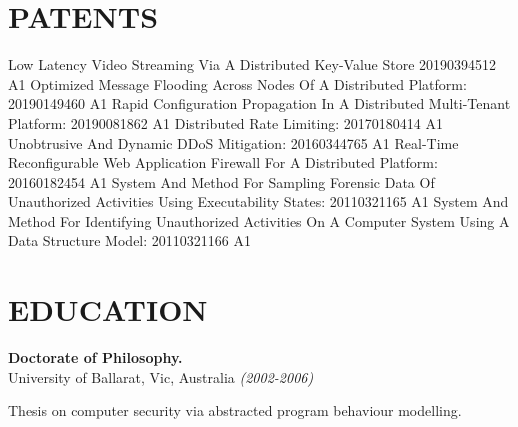 \documentclass[margin]{res}
\begin{document}
\begin{resume}



\section{PATENTS}
 Low Latency Video Streaming Via A Distributed Key-Value Store 20190394512 A1
 Optimized Message Flooding Across Nodes Of A Distributed Platform: 20190149460 A1
 Rapid Configuration Propagation In A Distributed Multi-Tenant Platform: 20190081862 A1
 Distributed Rate Limiting: 20170180414 A1
 Unobtrusive And Dynamic DDoS Mitigation: 20160344765 A1
 Real-Time Reconfigurable Web Application Firewall For A Distributed Platform: 20160182454 A1
 System And Method For Sampling Forensic Data Of Unauthorized Activities Using Executability States: 20110321165 A1
 System And Method For Identifying Unauthorized Activities On A Computer System Using A Data Structure Model: 20110321166 A1
\section{EDUCATION}

{\bf Doctorate of Philosophy.} \\
University of Ballarat, Vic, Australia {\em (2002-2006)}
\begin{list}{}{\leftmargin=1.5em \topsep=5pt \partopsep=0pt \parsep=2.5pt}
  \item Thesis on computer security via abstracted program behaviour modelling.
\end{list}


\end{resume}
\end{document}
